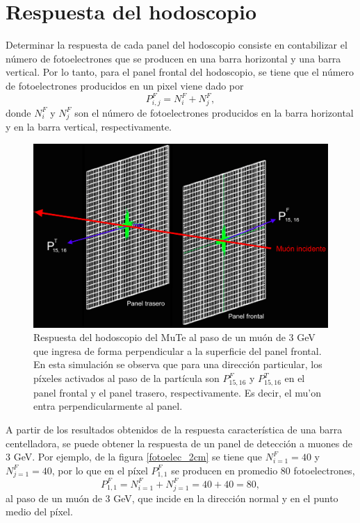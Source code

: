 \documentclass[12pt,oneside,openany,letter]{book}
\begin{document}

\section{Respuesta del hodoscopio}\label{section_hodoscopio}
Determinar la respuesta de cada panel del hodoscopio consiste en contabilizar el número de fotoelectrones que se producen en una barra horizontal y una barra vertical. Por lo tanto, para el panel frontal del hodoscopio, se tiene que el n\'umero de fotoelectrones producidos en un pixel viene dado por 
\begin{equation}
\label{n_FE}
P^{F}_{i,j}=N^{F}_{i}+N^{F}_{j},
\end{equation}
donde $N^{F}_{i}$ y $N^{F}_j$ son el n\'umero de fotoelectrones producidos en la barra horizontal y en la barra vertical, respectivamente.
\begin{figure}[h!]
    \centering
        \includegraphics[scale=0.42]{images/panel_geant4.png}
   \caption[Respuesta del hodoscopio del MuTe simulado en Geant4]{Respuesta del hodoscopio del MuTe al paso de un muón de 3 GeV que ingresa de forma perpendicular a la superficie del panel frontal. En esta simulaci\'on se observa que para una dirección particular, los píxeles activados al paso de la partícula son $P^{F}_{15,16}$ y $P^{T}_{15,16}$ en el panel frontal y el panel trasero, respectivamente. Es decir, el mu'on entra perpendicularmente al panel.}\label{panel_geant4}
\end{figure}

A partir de los resultados obtenidos de la respuesta característica de una barra centelladora, se puede obtener la respuesta de un panel de detección a muones de 3 GeV. Por ejemplo, de la figura \ref{fotoelec_2cm} se tiene que $N^{F}_{i=1}=40$ y $N^{F}_{j=1}=40$, por lo que en el píxel $P^{F}_{1,1}$ se producen en promedio 80 fotoelectrones,
\begin{equation}
P^{F}_{1,1}=N^{F}_{i=1}+N^{F}_{j=1} = 40+40=80,
\end{equation}
al paso de un muón de 3 GeV, que incide en la dirección normal y en el punto medio del píxel. 
\end{document}
